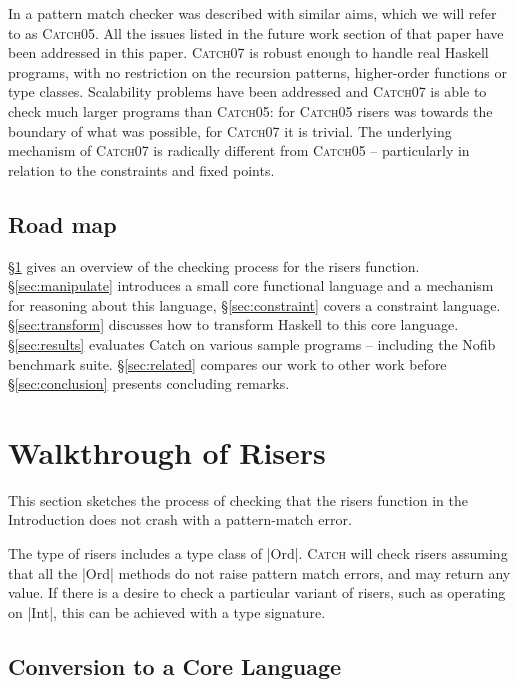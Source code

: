 \documentclass[preprint]{sigplanconf}
\newcommand{\C}[1]{\textsf{#1}}
\newcommand{\catch}{\textsc{Catch}}
\begin{document}
In \citet{me:catch_tfp} a pattern match checker was described with similar aims, which we will refer to as \catch05. All the issues listed in the future work section of that paper have been addressed in this paper. \catch07 is robust enough to handle real Haskell programs, with no restriction on the recursion patterns, higher-order functions or type classes. Scalability problems have been addressed and \catch07 is able to check much larger programs than \catch05: for \catch05 risers was towards the boundary of what was possible, for \catch07 it is trivial. The underlying mechanism of \catch07 is radically different from \catch05 -- particularly in relation to the constraints and fixed points.

\subsection{Road map}

\S\ref{sec:walkthrough} gives an overview of the checking process for the \C{risers} function. \S\ref{sec:manipulate} introduces a small core functional language and a mechanism for reasoning about this language, \S\ref{sec:constraint} covers a constraint language. \S\ref{sec:transform} discusses how to transform Haskell to this core language. \S\ref{sec:results} evaluates Catch on various sample programs -- including the Nofib benchmark suite. \S\ref{sec:related} compares our work to other work before \S\ref{sec:conclusion} presents concluding remarks.

\section{Walkthrough of Risers}
\label{sec:walkthrough}

This section sketches the process of checking that the \C{risers} function in the Introduction does not crash with a pattern-match error.

The type of \C{risers} includes a type class of |Ord|. \catch{} will check \C{risers} assuming that all the |Ord| methods do not raise pattern match errors, and may return any value. If there is a desire to check a particular variant of \C{risers}, such as operating on |Int|, this can be achieved with a type signature.

\subsection{Conversion to a Core Language}
\end{document}
